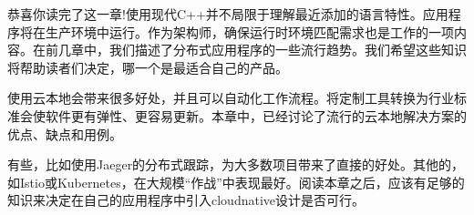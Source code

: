 恭喜你读完了这一章!使用现代C++并不局限于理解最近添加的语言特性。应用程序将在生产环境中运行。作为架构师，确保运行时环境匹配需求也是工作的一项内容。在前几章中，我们描述了分布式应用程序的一些流行趋势。我们希望这些知识将帮助读者们决定，哪一个是最适合自己的产品。

使用云本地会带来很多好处，并且可以自动化工作流程。将定制工具转换为行业标准会使软件更有弹性、更容易更新。本章中，已经讨论了流行的云本地解决方案的优点、缺点和用例。

有些，比如使用Jaeger的分布式跟踪，为大多数项目带来了直接的好处。其他的，如Istio或Kubernetes，在大规模“作战”中表现最好。阅读本章之后，应该有足够的知识来决定在自己的应用程序中引入cloudnative设计是否可行。